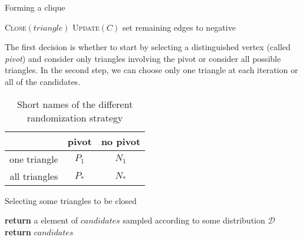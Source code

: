 \begin{algorithm}
	\caption{Forming a clique \label{alg:complete}}
	\begin{algorithmic}[0]
				\State \textsc{Close}$(triangle)$
			\EndFor
			\State \textsc{Update}$(C)$
		\EndWhile
		\State set remaining edges to negative
	\end{algorithmic}
\end{algorithm}



The first decision is whether to start by selecting a distinguished vertex
(called \emph{pivot}) and consider only triangles involving the pivot or
consider all possible triangles. In the second step, we can choose only one
triangle at each iteration or all of the candidates.

\begin{table}[htpb]
	\centering
	\caption{Short names of the different randomization strategy
		\label{tab:strategy}}
	\begin{tabular}{ccc}
		\toprule
		              & pivot & no pivot \\
		\midrule
		one triangle  & $P_1$ & $N_1$ \\
		all triangles & $P_*$ & $N_*$ \\
		\bottomrule
	\end{tabular}
\end{table}

\begin{algorithm}
	\caption{Selecting some triangles to be closed \label{alg:pick}}
	\begin{algorithmic}[0]
			\Else
			\EndIf
				\State \textbf{return} a element of $candidates$ sampled
				according to some distribution $\mathcal{D}$
			\Else {}
				\State \textbf{return} $candidates$
			\EndIf
		\EndFunction
	\end{algorithmic}
\end{algorithm}

